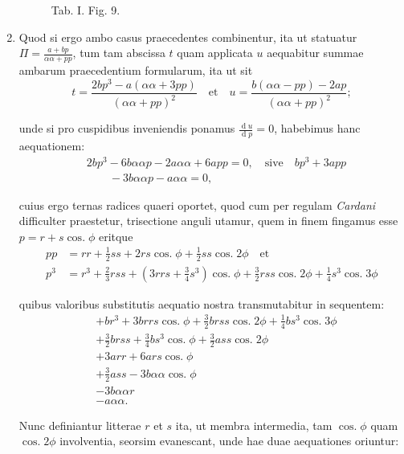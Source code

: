 \documentclass[10pt,a4paper]{article}
\DeclareMathOperator{\cosg}{cos.}
\begin{document}
\begin{paracol}{2}
\begin{enumerate}[topsep=1px]
\begin{figure}[h]
{\begin{tikzpicture}[rotate=180, scale=1]
				\end{tikzpicture}}
			\selectfont
			\caption{Tab. I. Fig. 9.}
		\end{figure}

		\switchcolumn*	
		
		\item Quod si ergo ambo casus praecedentes combinentur, ita ut statuatur $\Pi=\frac{a + bp}{\alpha \alpha + pp}$, tum tam abscissa $t$ quam applicata $u$ aequabitur summae ambarum praecedentium formularum, ita ut sit
		\[
			t = \frac{2bp^3 - a(\alpha \alpha + 3pp)}{(\alpha \alpha + pp)^2} \quad \text{et} \quad u = \frac{b(\alpha \alpha - pp)-2ap}{(\alpha \alpha + pp)^2};
		\]
		\par unde si pro cuspidibus inveniendis ponamus $\frac{\operatorname{d}u}{\operatorname{d}p} = 0$, habebimus hanc aequationem:
		\begin{align*}
			&2bp^3-6b\alpha \alpha p -2a \alpha \alpha +6a pp = 0, \quad \text{sive} \quad bp^3+3app\\
			&\qquad-3b\alpha \alpha p - a\alpha \alpha = 0,
		\end{align*}
		\par cuius ergo ternas radices quaeri oportet, quod cum per regulam \textit{Cardani} difficulter praestetur, trisectione anguli utamur, quem in finem fingamus esse $p=r+s\cosg \phi$ eritque
		\begin{align*}
			pp & = rr + \frac{1}{2}ss +2rs \cosg\phi + \frac{1}{2}ss \cosg 2\phi \quad \text{et}\\
			p^3 & = r^3+\frac{2}{3}rss + (3rrs+\frac{3}{4}s^3)\cosg \phi + \frac{3}{2} rss \cosg 2\phi+\frac{1}{4}s^3\cosg 3\phi
		\end{align*}
		\par quibus valoribus substitutis aequatio nostra transmutabitur in sequentem:
		\begin{align*}
			&+br^3+3brrs \cosg \phi + \frac{3}{2}brss \cosg 2\phi+ \frac{1}{4}bs^3\cosg 3\phi\\
			&+\frac{3}{2}brss + \frac{3}{4}bs^3\cosg \phi + \frac{3}{2}ass \cosg 2\phi\\
			&+3arr + 6ars \cosg \phi\\
			&+\frac{3}{2}ass - 3b\alpha \alpha \cosg \phi\\
			&-3b\alpha \alpha r\\
			&-a \alpha \alpha.
		\end{align*}
		\par Nunc definiantur litterae $r$ et $s$ ita, ut membra intermedia, tam $\cosg \phi$ quam $\cosg 2\phi$ involventia, seorsim evanescant, unde hae duae aequationes oriuntur:

\end{enumerate}
\end{paracol}
\end{document}
